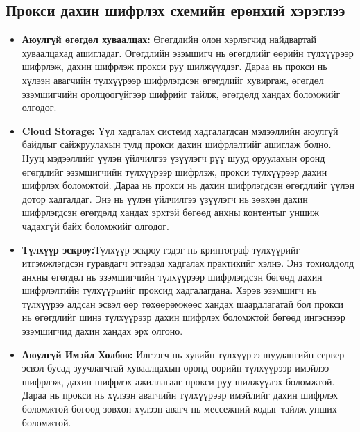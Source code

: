 \subsection*{Прокси дахин шифрлэх схемийн ерөнхий хэрэглээ}
\begin{itemize}
    \item \textbf{Аюулгүй өгөгдөл хуваалцах:} Өгөгдлийн олон хэрлэгчид найдвартай хуваалцахад ашигладаг. Өгөгдлийн эзэмшигч нь өгөгдлийг өөрийн түлхүүрээр шифрлэж, дахин шифрлэж прокси руу шилжүүлдэг. Дараа нь прокси нь хүлээн авагчийн түлхүүрээр шифрлэгдсэн өгөгдлийг хувиргаж, өгөгдөл эзэмшигчийн оролцоогүйгээр шифрийг тайлж, өгөгдөлд хандах боломжийг олгодог.

    \item \textbf{Cloud Storage:} Үүл хадгалах системд хадгалагдсан мэдээллийн аюулгүй байдлыг сайжруулахын тулд прокси дахин шифрлэлтийг ашиглаж болно. Нууц мэдээллийг үүлэн үйлчилгээ үзүүлэгч рүү шууд оруулахын оронд өгөгдлийг эзэмшигчийн түлхүүрээр шифрлэж, прокси түлхүүрээр дахин шифрлэх боломжтой. Дараа нь прокси нь дахин шифрлэгдсэн өгөгдлийг үүлэн дотор хадгалдаг. Энэ нь үүлэн үйлчилгээ үзүүлэгч нь зөвхөн дахин шифрлэгдсэн өгөгдөлд хандах эрхтэй бөгөөд анхны контентыг уншиж чадахгүй байх боломжийг олгодог.

    \item \textbf{Түлхүүр эскроу:}Түлхүүр эскроу гэдэг нь криптограф түлхүүрийг итгэмжлэгдсэн гуравдагч этгээдэд хадгалах практикийг хэлнэ. Энэ тохиолдолд анхны өгөгдөл нь эзэмшигчийн түлхүүрээр шифрлэгдсэн бөгөөд дахин шифрлэлтийн түлхүүрnийг проксид хадгалагдана. Хэрэв эзэмшигч нь түлхүүрээ алдсан эсвэл өөр төхөөрөмжөөс хандах шаардлагатай бол прокси нь өгөгдлийг шинэ түлхүүрээр дахин шифрлэх боломжтой бөгөөд ингэснээр эзэмшигчид дахин хандах эрх олгоно.

    \item \textbf{Аюулгүй Имэйл Холбоо:} Илгээгч нь хувийн түлхүүрээ шуудангийн сервер эсвэл бусад зуучлагчтай хуваалцахын оронд өөрийн түлхүүрээр имэйлээ шифрлэж, дахин шифрлэх ажиллагааг прокси руу шилжүүлэх боломжтой. Дараа нь прокси нь хүлээн авагчийн түлхүүрээр имэйлийг дахин шифрлэх боломжтой бөгөөд зөвхөн хүлээн авагч нь мессежний кодыг тайлж унших боломжтой.
\end{itemize}

